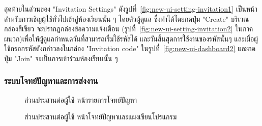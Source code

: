 \documentclass[12pt,one side,openright,a4paper]{cpe-thesis-th}
\newcommand{\thaijustify}[1]{%
  \par\hspace{30pt}\justifying
  #1
}
\begin{document}
                \thaijustify{
                    สุดท้ายในส่วนของ "Invitation Settings" ดังรูปที่~\ref{fig:new-ui-setting-invitation1} เป็นหน้าสำหรับการเชิญผู้ใช้ทั่วไปเข้าสู่ห้องเรียนนั้น ๆ โดยตัวผู้ดูแล ซึ่งทำได้โดยกดปุ่ม "Create" บริเวณกล่องสีเขียว จะปรากฏกล่องข้อความแจ้งเตือน (รูปที่~\ref{fig:new-ui-setting-invitation2} ในภาคผนวก)เพื่อให้ผู้ดูแลกำหนดวันที่สามารถเริ่มใช้รหัสได้ และวันสิ้นสุดการใช้งานของรหัสนั้นๆ และเมื่อผู้ใช้กรอกรหัสดังกล่าวลงในกล่อง "Invitation code" ในรูปที่~\ref{fig:new-ui-dashboard2} และกดปุ่ม "Join" จะเป็นการเข้าร่วมห้องเรียนนั้น ๆ 
                }
            \subsubsection{ระบบโจทย์ปัญหาและการส่งงาน}
                \begin{figure}[H]
                    \centering
                    \caption[ส่วนประสานต่อผู้ใช้ หน้ารายการโจทย์ปัญหา]{ส่วนประสานต่อผู้ใช้ หน้ารายการโจทย์ปัญหา}
                    \label{fig:new-ui-assign1}
                \end{figure}
                \begin{figure}[H]
                    \centering
                    \caption[ส่วนประสานต่อผู้ใช้ หน้าแผงเขียนโปรแกรมกับโจทย์ปัญหา]{ส่วนประสานต่อผู้ใช้ หน้าโจทย์ปัญหาและแผงเขียนโปรแกรม}
                    \label{fig:new-ui-code1}
                \end{figure}
\end{document}
